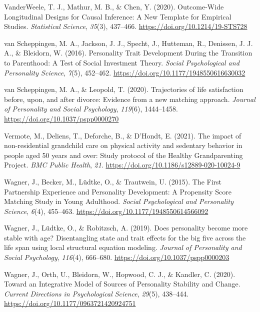 \documentclass[
  english,
  man, noextraspace]{apa7}
\begin{document}
\leavevmode\hypertarget{ref-vanderweeleOutcomeWideLongitudinalDesigns2020}{}%
VanderWeele, T. J., Mathur, M. B., \& Chen, Y. (2020). Outcome-Wide Longitudinal Designs for Causal Inference: A New Template for Empirical Studies. \emph{Statistical Science}, \emph{35}(3), 437--466. \url{https://doi.org/10.1214/19-STS728}

\leavevmode\hypertarget{ref-vanscheppingenPersonalityTraitDevelopment2016}{}%
van Scheppingen, M. A., Jackson, J. J., Specht, J., Hutteman, R., Denissen, J. J. A., \& Bleidorn, W. (2016). Personality Trait Development During the Transition to Parenthood: A Test of Social Investment Theory. \emph{Social Psychological and Personality Science}, \emph{7}(5), 452--462. \url{https://doi.org/10.1177/1948550616630032}

\leavevmode\hypertarget{ref-vanscheppingenTrajectoriesLifeSatisfaction2020}{}%
van Scheppingen, M. A., \& Leopold, T. (2020). Trajectories of life satisfaction before, upon, and after divorce: Evidence from a new matching approach. \emph{Journal of Personality and Social Psychology}, \emph{119}(6), 1444--1458. \url{https://doi.org/10.1037/pspp0000270}

\leavevmode\hypertarget{ref-vermoteImpactNonresidentialGrandchild2021a}{}%
Vermote, M., Deliens, T., Deforche, B., \& D'Hondt, E. (2021). The impact of non-residential grandchild care on physical activity and sedentary behavior in people aged 50 years and over: Study protocol of the Healthy Grandparenting Project. \emph{BMC Public Health}, \emph{21}. \url{https://doi.org/10.1186/s12889-020-10024-9}

\leavevmode\hypertarget{ref-wagnerFirstPartnershipExperience2015}{}%
Wagner, J., Becker, M., Lüdtke, O., \& Trautwein, U. (2015). The First Partnership Experience and Personality Development: A Propensity Score Matching Study in Young Adulthood. \emph{Social Psychological and Personality Science}, \emph{6}(4), 455--463. \url{https://doi.org/10.1177/1948550614566092}

\leavevmode\hypertarget{ref-wagnerDoesPersonalityBecome2019}{}%
Wagner, J., Lüdtke, O., \& Robitzsch, A. (2019). Does personality become more stable with age? Disentangling state and trait effects for the big five across the life span using local structural equation modeling. \emph{Journal of Personality and Social Psychology}, \emph{116}(4), 666--680. \url{https://doi.org/10.1037/pspp0000203}

\leavevmode\hypertarget{ref-wagnerIntegrativeModelSources2020}{}%
Wagner, J., Orth, U., Bleidorn, W., Hopwood, C. J., \& Kandler, C. (2020). Toward an Integrative Model of Sources of Personality Stability and Change. \emph{Current Directions in Psychological Science}, \emph{29}(5), 438--444. \url{https://doi.org/10.1177/0963721420924751}
\end{document}
